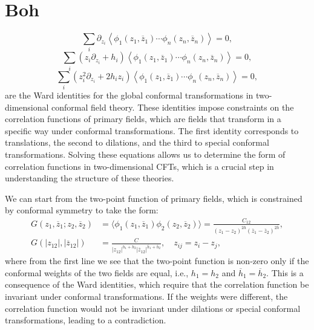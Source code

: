 \section{Boh}

\[
    \sum_{i} \partial_{z_i} \left\langle \phi_1(z_1,\overline{z}_1) \cdots \phi_n(z_n,\overline{z}_n) \right\rangle = 0,
\]
\[
    \sum_{i} (z_i \partial_{z_i} + h_i) \left\langle \phi_1(z_1,\overline{z}_1) \cdots \phi_n(z_n,\overline{z}_n) \right\rangle = 0,
\]
\[
    \sum_{i} (z_i^2 \partial_{z_i} + 2 h_i z_i) \left\langle \phi_1(z_1,\overline{z}_1) \cdots \phi_n(z_n,\overline{z}_n) \right\rangle = 0,
\]
are the Ward identities for the global conformal transformations in two-dimensional conformal field theory. These identities impose constraints on the correlation functions of primary fields, which are fields that transform in a specific way under conformal transformations. The first identity corresponds to translations, the second to dilations, and the third to special conformal transformations. Solving these equations allows us to determine the form of correlation functions in two-dimensional CFTs, which is a crucial step in understanding the structure of these theories.

We can start from the two-point function of primary fields, which is constrained by conformal symmetry to take the form:
\[
    \begin{aligned}
        G(z_1,\overline{z}_1; z_2,\overline{z}_2)            & = \langle \phi_1(z_1,\overline{z}_1) \phi_2(z_2,\overline{z}_2) \rangle = \frac{C_{12}}{(z_1 - z_2)^{2h} (\overline{z}_1 - \overline{z}_2)^{2\overline{h}}}, \\
        G(\vert z_{12} \vert, \vert \overline{z}_{12} \vert) & = \frac{C}{\vert z_{12} \vert^{h_1 + h_2} \vert \overline{z}_{12} \vert^{\overline{h}_1 + \overline{h}_2}}, \quad z_{ij} = z_i - z_j,
    \end{aligned}
\]
where from the first line we see that the two-point function is non-zero only if the conformal weights of the two fields are equal, i.e., $h_1 = h_2$ and $\overline{h}_1 = \overline{h}_2$. This is a consequence of the Ward identities, which require that the correlation function be invariant under conformal transformations. If the weights were different, the correlation function would not be invariant under dilations or special conformal transformations, leading to a contradiction.

